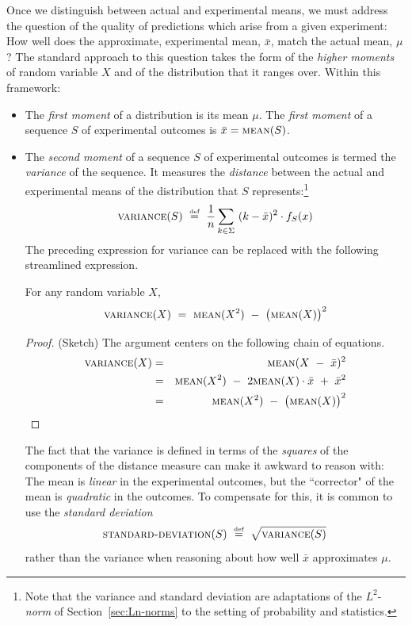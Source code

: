 Once we distinguish between actual and experimental means, we must address the question of the quality of predictions which arise from a given experiment:  How well does the approximate, experimental mean, $\bar{x}$, match the actual mean, $\mu$?  The standard approach to this question takes the form of the {\em higher moments} of random variable $X$ and of the distribution that it ranges over.  Within this framework:
\begin{itemize}
\item
The {\em first moment} of a distribution is its mean $\mu$.  The  {\em first moment} of a sequence $S$ of experimental outcomes is $\bar{x}  =  \mbox{\sc mean}(S)$.
\item
The {\em second moment} of a sequence $S$ of experimental outcomes is termed the {\it variance} of the sequence.   It measures the {\em distance} between the actual and experimental means of the distribution that $S$ represents:\footnote{Note that the variance and standard deviation are adaptations of the $L^2$-{\it norm} of Section~\ref{sec:Ln-norms} to the setting of probability and statistics.}
\[  \mbox{\sc variance}(S) \ \stackrel{\mbox{{\tiny def}}}{=} \ {1 \over n} \sum_{k \in \Sigma}
\ (k - \bar{x})^2 \cdot f_S(x) 
\]
The preceding expression for variance can be replaced with the following streamlined expression.

\begin{prop}
\label{thm:variance-formula}
For any random variable $X$,
\[ \mbox{\sc variance}(X) \ = \ \mbox{\sc mean}(X^2) \ - \ \big(\mbox{\sc mean}(X)\big)^2 \]
\end{prop}

\begin{proof}{(Sketch)}
The argument centers on the following chain of equations.
\begin{eqnarray*}
\mbox{\sc variance}(X) & = &
  \mbox{\sc mean}(X \ - \ \bar{x})^2 \\
 & = &
\mbox{\sc mean}(X^2) \ - \ 2 \mbox{\sc mean}(X) \cdot \bar{x} \ + \ \bar{x}^2 \\
 & = &
\mbox{\sc mean}(X^2) \ - \ \big(\mbox{\sc mean}(X)\big)^2
\end{eqnarray*}
\end{proof}


The fact that the variance is defined in terms of the {\em squares} of the components of the distance measure can make it awkward to reason with:  The mean is {\em linear} in the experimental outcomes, but the ``corrector" of the mean is {\em quadratic} in the outcomes.  To compensate for this, it is common to use the {\it standard deviation}
\[ \mbox{\sc standard-deviation}(S) \ \eqdef \ \sqrt{\mbox{\sc variance}(S)} \]
rather than the variance when reasoning about how well $\bar{x}$ approximates $\mu$.


\end{itemize}

